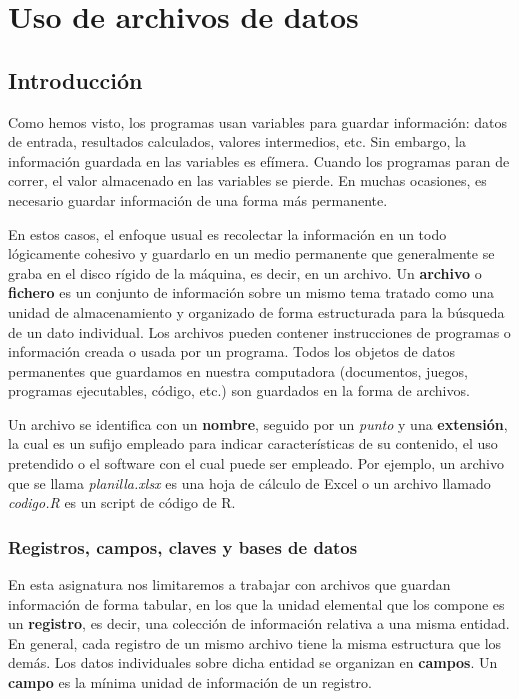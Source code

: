 \documentclass[
]{book}
\begin{document}
\hypertarget{uso-de-archivos-de-datos}{%
\chapter{Uso de archivos de datos}\label{uso-de-archivos-de-datos}}

\hypertarget{introducciuxf3n}{%
\section{Introducción}\label{introducciuxf3n}}

Como hemos visto, los programas usan variables para guardar información: datos de entrada, resultados calculados, valores intermedios, etc. Sin embargo, la información guardada en las variables es efímera. Cuando los programas paran de correr, el valor almacenado en las variables se pierde. En muchas ocasiones, es necesario guardar información de una forma más permanente.

En estos casos, el enfoque usual es recolectar la información en un todo lógicamente cohesivo y guardarlo en un medio permanente que generalmente se graba en el disco rígido de la máquina, es decir, en un archivo. Un \textbf{archivo} o \textbf{fichero} es un conjunto de información sobre un mismo tema tratado como una unidad de almacenamiento y organizado de forma estructurada para la búsqueda de un dato individual. Los archivos pueden contener instrucciones de programas o información creada o usada por un programa. Todos los objetos de datos permanentes que guardamos en nuestra computadora (documentos, juegos, programas ejecutables, código, etc.) son guardados en la forma de archivos.

Un archivo se identifica con un \textbf{nombre}, seguido por un \emph{punto} y una \textbf{extensión}, la cual es un sufijo empleado para indicar características de su contenido, el uso pretendido o el software con el cual puede ser empleado. Por ejemplo, un archivo que se llama \emph{planilla.xlsx} es una hoja de cálculo de Excel o un archivo llamado \emph{codigo.R} es un script de código de R.

\hypertarget{registros-campos-claves-y-bases-de-datos}{%
\subsection{Registros, campos, claves y bases de datos}\label{registros-campos-claves-y-bases-de-datos}}

En esta asignatura nos limitaremos a trabajar con archivos que guardan información de forma tabular, en los que la unidad elemental que los compone es un \textbf{registro}, es decir, una colección de información relativa a una misma entidad. En general, cada registro de un mismo archivo tiene la misma estructura que los demás. Los datos individuales sobre dicha entidad se organizan en \textbf{campos}. Un \textbf{campo} es la mínima unidad de información de un registro.
\end{document}
